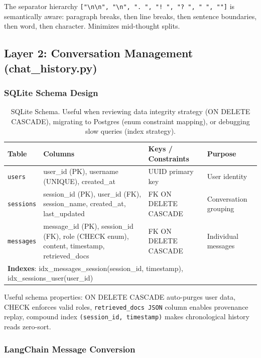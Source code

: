 \documentclass[12pt,a4paper]{article}
\begin{document}
The separator hierarchy \texttt{["\textbackslash n\textbackslash n", "\textbackslash n", ". ", "! ", "? ", " ", ""]} is semantically aware: paragraph breaks, then line breaks, then sentence boundaries, then word, then character. Minimizes mid-thought splits.

\subsection{Layer 2: Conversation Management (chat\_history.py)}

\subsubsection{SQLite Schema Design}

\begin{table}[H]
\centering
\footnotesize
\begin{tabular}{@{}llll@{}}
\toprule
\textbf{Table} & \textbf{Columns} & \textbf{Keys / Constraints} & \textbf{Purpose} \\
\midrule
\texttt{users} & user\_id (PK), username (UNIQUE), created\_at & UUID primary key & User identity \\
\texttt{sessions} & session\_id (PK), user\_id (FK), session\_name, created\_at, last\_updated & FK ON DELETE CASCADE & Conversation grouping \\
\texttt{messages} & message\_id (PK), session\_id (FK), role (CHECK enum), content, timestamp, retrieved\_docs & FK ON DELETE CASCADE & Individual messages \\
\midrule
\multicolumn{4}{l}{\textbf{Indexes}: idx\_messages\_session(session\_id, timestamp), idx\_sessions\_user(user\_id)} \\
\bottomrule
\end{tabular}
\caption{SQLite Schema. Useful when reviewing data integrity strategy (ON DELETE CASCADE), migrating to Postgres (enum constraint mapping), or debugging slow queries (index strategy).}
\end{table}

Useful schema properties: ON DELETE CASCADE auto-purges user data, CHECK enforces valid roles, \texttt{retrieved\_docs JSON} column enables provenance replay, compound index \texttt{(session\_id, timestamp)} makes chronological history reads zero-sort.

\newpage

\subsubsection{LangChain Message Conversion}
\end{document}
